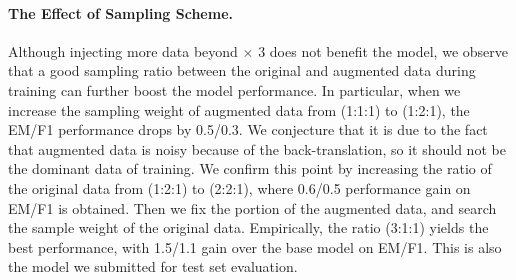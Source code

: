 \documentclass{article} \usepackage{iclr2018_conference,times}
\begin{document}
\paragraph{The Effect of Sampling Scheme.}
Although injecting more data beyond $\times$ 3 does not benefit the model, we observe that a good sampling ratio between the original and augmented data during training can further boost the model performance. In particular, when we increase the sampling weight of augmented data from (1:1:1) to (1:2:1), the EM/F1 performance drops by 0.5/0.3. We conjecture that it is due to the fact that augmented data is noisy because of the back-translation, so it should not be the dominant data of training. We confirm this point by increasing the ratio of the original data from (1:2:1) to (2:2:1), where 0.6/0.5 performance gain on EM/F1 is obtained. Then we fix the portion of the augmented data, and search the sample weight of the original data. Empirically, the ratio (3:1:1) yields the best performance, with 1.5/1.1 gain over the base model on EM/F1. This is also the model we submitted for test set evaluation.
\end{document}
